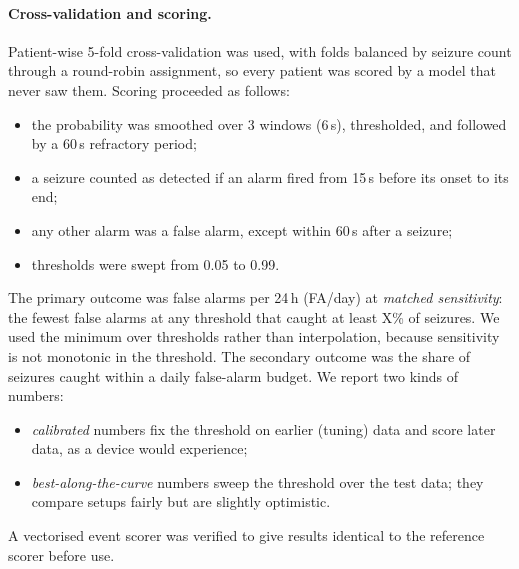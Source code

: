 \paragraph{Cross-validation and scoring.} Patient-wise 5-fold cross-validation was used, with folds balanced by seizure count through a round-robin assignment, so every patient was scored by a model that never saw them. Scoring proceeded as follows:
\begin{itemize}
\item the probability was smoothed over 3 windows (6\,s), thresholded, and followed by a 60\,s refractory period;
\item a seizure counted as detected if an alarm fired from 15\,s before its onset to its end;
\item any other alarm was a false alarm, except within 60\,s after a seizure;
\item thresholds were swept from 0.05 to 0.99.
\end{itemize}
The primary outcome was false alarms per 24\,h (FA/day) at \emph{matched sensitivity}: the fewest false alarms at any threshold that caught at least X\% of seizures. We used the minimum over thresholds rather than interpolation, because sensitivity is not monotonic in the threshold. The secondary outcome was the share of seizures caught within a daily false-alarm budget. We report two kinds of numbers:
\begin{itemize}
\item \emph{calibrated} numbers fix the threshold on earlier (tuning) data and score later data, as a device would experience;
\item \emph{best-along-the-curve} numbers sweep the threshold over the test data; they compare setups fairly but are slightly optimistic.
\end{itemize}
A vectorised event scorer was verified to give results identical to the reference scorer before use.

